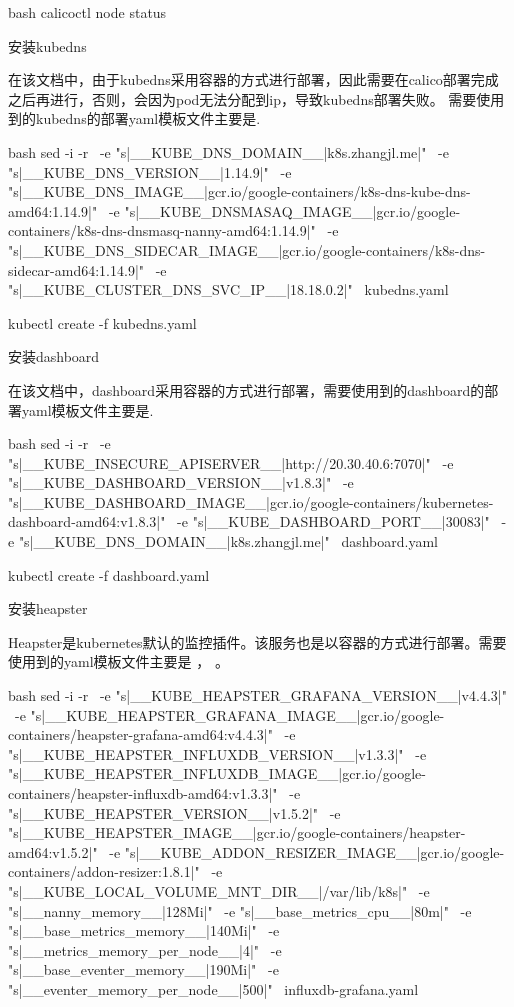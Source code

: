 \begin{outline}[enumerate]
\begin{code-in-enumerate}{bash}
calicoctl node status
\end{code-in-enumerate}

\1 安装kubedns

在该文档中，由于kubedns采用容器的方式进行部署，因此需要在calico部署完成之后再进行，否则，会因为pod无法分配到ip，导致kubedns部署失败。
需要使用到的kubedns的部署yaml模板文件主要是.
\begin{code-in-enumerate}{bash}
sed -i -r \
    -e "s|__KUBE_DNS_DOMAIN__|k8s.zhangjl.me|" \
    -e "s|__KUBE_DNS_VERSION__|1.14.9|" \
    -e "s|__KUBE_DNS_IMAGE__|gcr.io/google-containers/k8s-dns-kube-dns-amd64:1.14.9|" \
    -e "s|__KUBE_DNSMASAQ_IMAGE__|gcr.io/google-containers/k8s-dns-dnsmasq-nanny-amd64:1.14.9|" \
    -e "s|__KUBE_DNS_SIDECAR_IMAGE__|gcr.io/google-containers/k8s-dns-sidecar-amd64:1.14.9|" \
    -e "s|__KUBE_CLUSTER_DNS_SVC_IP__|18.18.0.2|" \
    kubedns.yaml

kubectl create -f kubedns.yaml
\end{code-in-enumerate}

\1 安装dashboard

在该文档中，dashboard采用容器的方式进行部署，需要使用到的dashboard的部署yaml模板文件主要是.
\begin{code-in-enumerate}{bash}
    sed -i -r \
    -e "s|__KUBE_INSECURE_APISERVER__|http://20.30.40.6:7070|" \
    -e "s|__KUBE_DASHBOARD_VERSION__|v1.8.3|" \
    -e "s|__KUBE_DASHBOARD_IMAGE__|gcr.io/google-containers/kubernetes-dashboard-amd64:v1.8.3|" \
    -e "s|__KUBE_DASHBOARD_PORT__|30083|" \
    -e "s|__KUBE_DNS_DOMAIN__|k8s.zhangjl.me|" \
    dashboard.yaml

kubectl create -f dashboard.yaml
\end{code-in-enumerate}

\1 安装heapster

Heapster是kubernetes默认的监控插件。该服务也是以容器的方式进行部署。需要使用到的yaml模板文件主要是
，
。
\begin{code-in-enumerate}{bash}
sed -i -r \
    -e "s|__KUBE_HEAPSTER_GRAFANA_VERSION__|v4.4.3|" \
    -e "s|__KUBE_HEAPSTER_GRAFANA_IMAGE__|gcr.io/google-containers/heapster-grafana-amd64:v4.4.3|" \
    -e "s|__KUBE_HEAPSTER_INFLUXDB_VERSION__|v1.3.3|" \
    -e "s|__KUBE_HEAPSTER_INFLUXDB_IMAGE__|gcr.io/google-containers/heapster-influxdb-amd64:v1.3.3|" \
    -e "s|__KUBE_HEAPSTER_VERSION__|v1.5.2|" \
    -e "s|__KUBE_HEAPSTER_IMAGE__|gcr.io/google-containers/heapster-amd64:v1.5.2|" \
    -e "s|__KUBE_ADDON_RESIZER_IMAGE__|gcr.io/google-containers/addon-resizer:1.8.1|" \
    -e "s|__KUBE_LOCAL_VOLUME_MNT_DIR__|/var/lib/k8s|" \
    -e "s|__nanny_memory__|128Mi|" \
    -e "s|__base_metrics_cpu__|80m|" \
    -e "s|__base_metrics_memory__|140Mi|" \
    -e "s|__metrics_memory_per_node__|4|" \
    -e "s|__base_eventer_memory__|190Mi|" \
    -e "s|__eventer_memory_per_node__|500|" \
    influxdb-grafana.yaml


\end{code-in-enumerate}
\end{outline}

